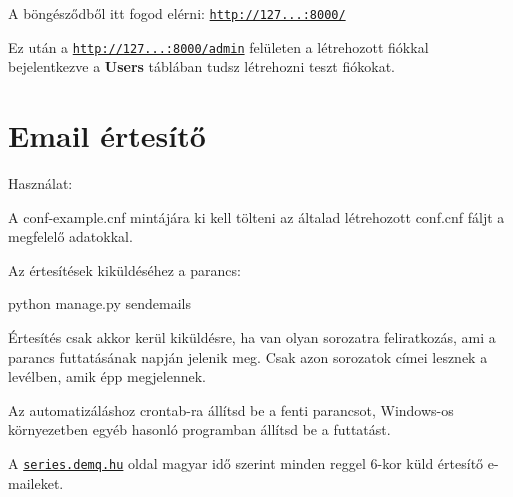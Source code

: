 A böngésződből itt fogod elérni\+: \href{http://127.0.0.1:8000/}{\tt http\+://127...\+:8000/}

Ez után a \href{http://127.0.0.1:8000/admin}{\tt http\+://127...\+:8000/admin} felületen a létrehozott fiókkal bejelentkezve a {\bfseries Users} táblában tudsz létrehozni teszt fiókokat.

\section*{Email értesítő }

Használat\+:
\begin{DoxyItemize}
\item A conf-\/example.\+cnf mintájára ki kell tölteni az általad létrehozott conf.\+cnf fáljt a megfelelő adatokkal.
\item Az értesítések kiküldéséhez a parancs\+: 
\begin{DoxyCode}
python manage.py sendemails
\end{DoxyCode}
 Értesítés csak akkor kerül kiküldésre, ha van olyan sorozatra feliratkozás, ami a parancs futtatásának napján jelenik meg. Csak azon sorozatok címei lesznek a levélben, amik épp megjelennek.
\end{DoxyItemize}

Az automatizáláshoz crontab-\/ra állítsd be a fenti parancsot, Windows-\/os környezetben egyéb hasonló programban állítsd be a futtatást.

A \href{https://series.demq.hu}{\tt series.\+demq.\+hu} oldal magyar idő szerint minden reggel 6-\/kor küld értesítő e-\/maileket. 